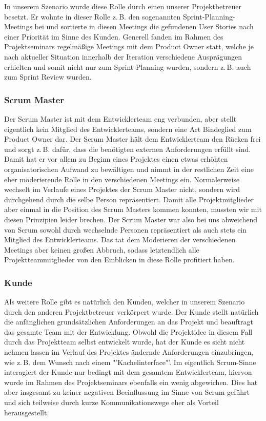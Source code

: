 In unserem Szenario wurde diese Rolle durch einen unserer Projektbetreuer besetzt. Er wohnte in dieser Rolle z.\,B. den sogenannten Sprint-Planning-Meetings bei und sortierte in diesen Meetings die gefundenen User Stories nach einer Priorität im Sinne des Kunden. Generell fanden im Rahmen des Projektseminars regelmäßige Meetings mit dem Product Owner statt, welche je nach aktueller Situation innerhalb der Iteration verschiedene Ausprägungen erhielten und somit nicht nur zum Sprint Planning wurden, sondern z.\,B. auch zum Sprint Review wurden.

\subsubsection{Scrum Master}
Der Scrum Master ist mit dem Entwicklerteam eng verbunden, aber stellt eigentlich kein Mitglied des Entwicklerteams, sondern eine Art Bindeglied zum Product Owner dar. Der Scrum Master hält dem Entwicklerteam den Rücken frei und sorgt z.\,B. dafür, dass die benötigten externen Anforderungen erfüllt sind. Damit hat er vor allem zu Beginn eines Projektes einen etwas erhöhten organisatorischen Aufwand zu bewältigen und nimmt in der restlichen Zeit eine eher moderierende Rolle in den verschiedenen Meetings ein. Normalerweise wechselt im Verlaufe eines Projektes der Scrum Master nicht, sondern wird durchgehend durch die selbe Person repräsentiert. Damit alle Projektmitglieder aber einmal in die Position des Scrum Masters kommen konnten, mussten wir mit diesen Prinzipien leider brechen. Der Scrum Master war also bei uns abweichend von Scrum sowohl durch wechselnde Personen repräsentiert als auch stets ein Mitglied des Entwicklerteams. Das tat dem Moderieren der verschiedenen Meetings aber keinen großen Abbruch, sodass letztendlich alle Projektteammitglieder von den Einblicken in diese Rolle profitiert haben.

\subsubsection{Kunde}
Als weitere Rolle gibt es natürlich den Kunden, welcher in unserem Szenario durch den anderen Projektbetreuer verkörpert wurde. Der Kunde stellt natürlich die anfänglichen grundsätzlichen Anforderungen an das Projekt und beauftragt das gesamte Team mit der Entwicklung. Obwohl die Projektidee in diesem Fall durch das Projektteam selbst entwickelt wurde, hat der Kunde es sicht nicht nehmen lassen im Verlauf des Projektes ändernde Anforderungen einzubringen, wie z.\,B. dem Wunsch nach einem "'Kachelinterface"'. Im eigentlich Scrum-Sinne interagiert der Kunde nur bedingt mit dem gesamtem Entwicklerteam, hiervon wurde im Rahmen des Projektseminars ebenfalls ein wenig abgewichen. Dies hat aber insgesamt zu keiner negativen Beeinflussung im Sinne von Scrum geführt und sich teilweise durch kurze Kommunikationswege eher als Vorteil herausgestellt.


